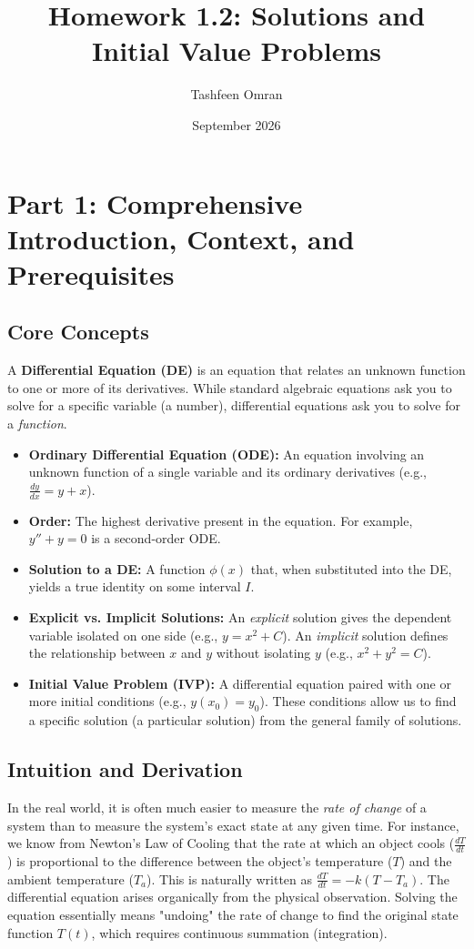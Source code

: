 \documentclass[12pt]{article}
\title{\textbf{Homework  1.2: Solutions and Initial Value Problems}}
\author{Tashfeen Omran}
\date{September 2026}
\begin{document}
\maketitle
\tableofcontents
\newpage

\section{Part 1: Comprehensive Introduction, Context, and Prerequisites}

\subsection{Core Concepts}
A \textbf{Differential Equation (DE)} is an equation that relates an unknown function to one or more of its derivatives. While standard algebraic equations ask you to solve for a specific variable (a number), differential equations ask you to solve for a \textit{function}. 
\begin{itemize}
    \item \textbf{Ordinary Differential Equation (ODE):} An equation involving an unknown function of a single variable and its ordinary derivatives (e.g., $\frac{dy}{dx} = y + x$).
    \item \textbf{Order:} The highest derivative present in the equation. For example, $y'' + y = 0$ is a second-order ODE.
    \item \textbf{Solution to a DE:} A function $\phi(x)$ that, when substituted into the DE, yields a true identity on some interval $I$. 
    \item \textbf{Explicit vs. Implicit Solutions:} An \textit{explicit} solution gives the dependent variable isolated on one side (e.g., $y = x^2 + C$). An \textit{implicit} solution defines the relationship between $x$ and $y$ without isolating $y$ (e.g., $x^2 + y^2 = C$).
    \item \textbf{Initial Value Problem (IVP):} A differential equation paired with one or more initial conditions (e.g., $y(x_0) = y_0$). These conditions allow us to find a specific solution (a particular solution) from the general family of solutions.
\end{itemize}

\subsection{Intuition and Derivation}
In the real world, it is often much easier to measure the \textit{rate of change} of a system than to measure the system's exact state at any given time. For instance, we know from Newton's Law of Cooling that the rate at which an object cools ($\frac{dT}{dt}$) is proportional to the difference between the object's temperature ($T$) and the ambient temperature ($T_a$). This is naturally written as $\frac{dT}{dt} = -k(T - T_a)$. The differential equation arises organically from the physical observation. Solving the equation essentially means "undoing" the rate of change to find the original state function $T(t)$, which requires continuous summation (integration).
\end{document}
